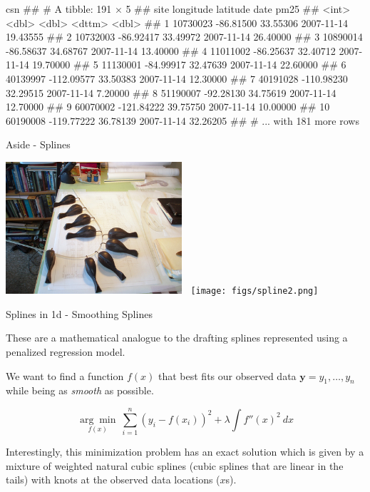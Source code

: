 \documentclass[11pt,ignorenonframetext,]{beamer}
\newenvironment{Shaded}{}{}
\newcommand{\NormalTok}[1]{#1}
\let\oldShaded\Shaded
\let\endoldShaded\endShaded
\renewenvironment{Shaded}{\footnotesize\begin{spacing}{0.9}\oldShaded}{\endoldShaded\end{spacing}}
\begin{document}
\begin{frame}[fragile]{}

\begin{Shaded}
\begin{Highlighting}[]
\NormalTok{csn}
\NormalTok{## # A tibble: 191 × 5}
\NormalTok{##        site  longitude latitude       date     pm25}
\NormalTok{##       <int>      <dbl>    <dbl>     <dttm>    <dbl>}
\NormalTok{## 1  10730023  -86.81500 33.55306 2007-11-14 19.43555}
\NormalTok{## 2  10732003  -86.92417 33.49972 2007-11-14 26.40000}
\NormalTok{## 3  10890014  -86.58637 34.68767 2007-11-14 13.40000}
\NormalTok{## 4  11011002  -86.25637 32.40712 2007-11-14 19.70000}
\NormalTok{## 5  11130001  -84.99917 32.47639 2007-11-14 22.60000}
\NormalTok{## 6  40139997 -112.09577 33.50383 2007-11-14 12.30000}
\NormalTok{## 7  40191028 -110.98230 32.29515 2007-11-14  7.20000}
\NormalTok{## 8  51190007  -92.28130 34.75619 2007-11-14 12.70000}
\NormalTok{## 9  60070002 -121.84222 39.75750 2007-11-14 10.00000}
\NormalTok{## 10 60190008 -119.77222 36.78139 2007-11-14 32.26205}
\NormalTok{## # ... with 181 more rows}
\end{Highlighting}
\end{Shaded}

\end{frame}

\begin{frame}{Aside - Splines}

\begin{center}
\includegraphics[width=0.49\textwidth]{figs/spline1.png}
$~$
\texttt{[image: figs/spline2.png]}
\end{center}

\end{frame}

\begin{frame}[t]{Splines in 1d - Smoothing Splines}

These are a mathematical analogue to the drafting splines represented
using a penalized regression model.

\pause

We want to find a function \(f(x)\) that best fits our observed data
\(\bm{y} = y_1, \ldots, y_n\) while being as \emph{smooth} as possible.

\[ \underset{f(x)}{\arg\min} ~ \sum_{i=1}^n\left(y_i - f(x_i)\right)^2 + \lambda \int f''(x)^2 ~ dx \]

Interestingly, this minimization problem has an exact solution which is
given by a mixture of weighted natural cubic splines (cubic splines that
are linear in the tails) with knots at the observed data locations
(\(x\)s).

\end{frame}
\end{document}
